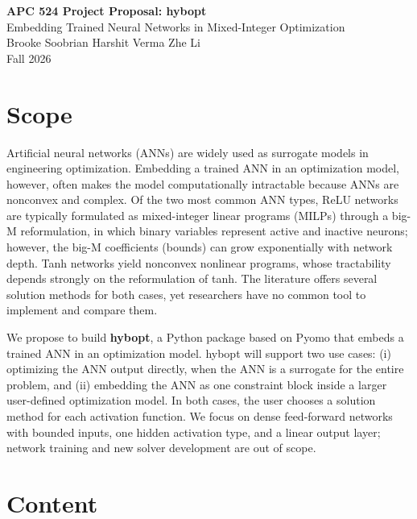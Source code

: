 \documentclass[11pt]{article}
\begin{document}
\begin{center}
  {\Large\bfseries APC 524 Project Proposal: hybopt}\\[2pt]
  {\large Embedding Trained Neural Networks in Mixed-Integer Optimization}\\[2pt]
  Brooke Soobrian \quad\textbullet\quad Harshit Verma \quad\textbullet\quad Zhe Li\\[2pt]
  Fall 2026
\end{center}

\section{Scope}

Artificial neural networks (ANNs) are widely used as surrogate models in engineering optimization.
Embedding a trained ANN in an optimization model, however, often makes the model computationally intractable because ANNs are nonconvex and complex.
Of the two most common ANN types, ReLU networks are typically formulated as mixed-integer linear programs (MILPs) through
a big-M reformulation, in which binary variables represent active and inactive neurons; however,
the big-M coefficients (bounds) can grow exponentially with network depth.
Tanh networks yield nonconvex nonlinear programs, whose tractability depends strongly on the reformulation of tanh.
The literature offers several solution methods for both cases, yet researchers have no common tool to implement and compare them.

We propose to build \textbf{hybopt}, a Python package based on Pyomo that embeds a trained ANN in an optimization model.
hybopt will support two use cases: (i) optimizing the ANN output directly, when the ANN is a surrogate for the entire problem,
and (ii) embedding the ANN as one constraint block inside a larger user-defined optimization model.
In both cases, the user chooses a solution method for each activation function.
We focus on dense feed-forward networks with bounded inputs, one hidden activation type, and a linear output layer;
network training and new solver development are out of scope.

\section{Content}
\end{document}
